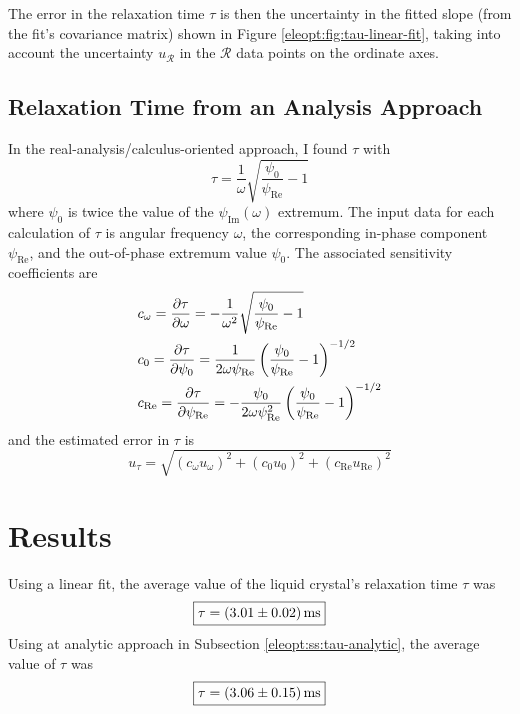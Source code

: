 \documentclass[11pt, a4paper]{article}
\begin{document}
The error in the relaxation time $ \tau $ is then the uncertainty in the fitted slope (from the fit's covariance matrix) shown in Figure \ref{eleopt:fig:tau-linear-fit}, taking into account the uncertainty $ u_{\mathcal{R}} $ in the $ \mathcal{R} $ data points on the ordinate axes.

\subsection{Relaxation Time from an Analysis Approach}
In the real-analysis/calculus-oriented approach, I found $ \tau $ with
\begin{equation*}
	\tau = \frac{1}{\omega} \sqrt{\frac{\psi_{0}}{\psi_{\text{Re}}} - 1}
\end{equation*}
where $ \psi_{0} $ is twice the value of the $ \psi_{\text{Im}}(\omega) $ extremum. The input data for each calculation of $ \tau $ is angular frequency $ \omega $, the corresponding in-phase component $ \psi_{\text{Re}} $, and the out-of-phase extremum value $ \psi_{0} $. The associated sensitivity coefficients are
\begin{align*}
	&c_{\omega} = \pdv{\tau}{\omega} = -\frac{1}{\omega^{2}} \sqrt{\frac{\psi_{0}}{\psi_{\text{Re}}} - 1}\\
	&c_{0} = \pdv{\tau}{\psi_{0}} = \frac{1}{2\omega \psi_{\text{Re}}} \left(\frac{\psi_{0}}{\psi_{\text{Re}}} - 1\right)^{-1/2}\\
	&c_{\text{Re}} = \pdv{\tau}{\psi_{\text{Re}}} = - \frac{\psi_{0}}{2\omega \psi^{2}_{\text{Re}}} \left(\frac{\psi_{0}}{\psi_{\text{Re}}} - 1\right)^{-1/2}
\end{align*}
and the estimated error in $ \tau $ is
\begin{equation*}
	u_{\tau} = \sqrt{(c_{\omega}u_{\omega})^{2} + (c_{0}u_{0})^{2} + (c_{\text{Re}}u_{\text{Re}})^{2} } 
\end{equation*}






\section{Results}
Using a linear fit, the average value of the liquid crystal's relaxation time $ \tau $ was
\begin{equation*}
	\boxed{\tau = \SI{3.01 \pm 0.02}{\milli \second}}
\end{equation*}
Using at analytic approach in Subsection \ref{eleopt:ss:tau-analytic}, the average value of $ \tau $ was
\begin{equation*}
	\boxed{\tau = \SI{3.06 \pm 0.15}{\milli \second}}
\end{equation*}
\end{document}
